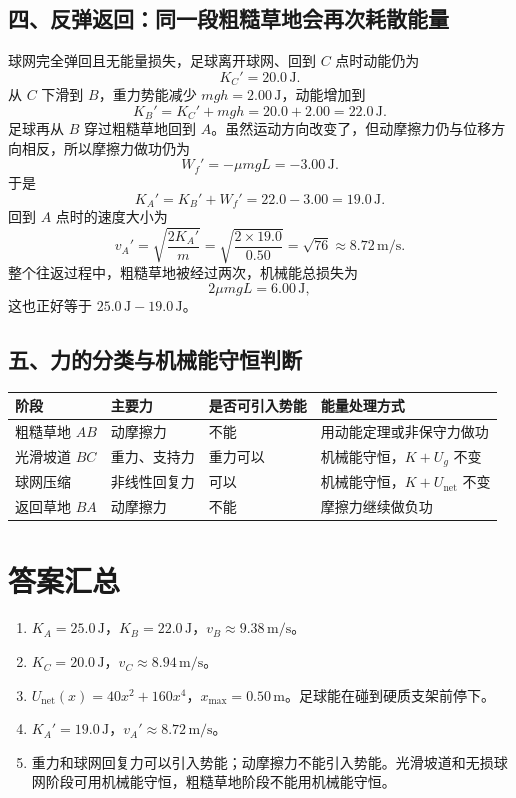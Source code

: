 \documentclass[11pt,a4paper,fontset=fandol]{ctexart}
\begin{document}
\subsection*{四、反弹返回：同一段粗糙草地会再次耗散能量}
球网完全弹回且无能量损失，足球离开球网、回到 $C$ 点时动能仍为
\[
 K_C'=20.0\,\mathrm{J}.
\]
从 $C$ 下滑到 $B$，重力势能减少 $mgh=2.00\,\mathrm{J}$，动能增加到
\[
 K_B'=K_C'+mgh=20.0+2.00=22.0\,\mathrm{J}.
\]
足球再从 $B$ 穿过粗糙草地回到 $A$。虽然运动方向改变了，但动摩擦力仍与位移方向相反，所以摩擦力做功仍为
\[
 W_f'=-\mu mgL=-3.00\,\mathrm{J}.
\]
于是
\[
 K_A'=K_B'+W_f'=22.0-3.00=19.0\,\mathrm{J}.
\]
回到 $A$ 点时的速度大小为
\[
 v_A'=\sqrt{\frac{2K_A'}{m}}=\sqrt{\frac{2\times 19.0}{0.50}}
=\sqrt{76}\approx 8.72\,\mathrm{m/s}.
\]
整个往返过程中，粗糙草地被经过两次，机械能总损失为
\[
 2\mu mgL=6.00\,\mathrm{J},
\]
这也正好等于 $25.0\,\mathrm{J}-19.0\,\mathrm{J}$。

\subsection*{五、力的分类与机械能守恒判断}
\begin{center}
\renewcommand{\arraystretch}{1.35}
\begin{tabular}{>{\centering\arraybackslash}p{2.7cm}>{\centering\arraybackslash}p{3.2cm}>{\centering\arraybackslash}p{3.2cm}>{\centering\arraybackslash}p{4.4cm}}
\toprule
阶段 & 主要力 & 是否可引入势能 & 能量处理方式 \\
\midrule
粗糙草地 $AB$ & 动摩擦力 & 不能 & 用动能定理或非保守力做功 \\
光滑坡道 $BC$ & 重力、支持力 & 重力可以 & 机械能守恒，$K+U_g$ 不变 \\
球网压缩 & 非线性回复力 & 可以 & 机械能守恒，$K+U_{\mathrm{net}}$ 不变 \\
返回草地 $BA$ & 动摩擦力 & 不能 & 摩擦力继续做负功 \\
\bottomrule
\end{tabular}
\end{center}

\section*{答案汇总}
\begin{ideaBox}
\begin{enumerate}
 \item $K_A=25.0\,\mathrm{J}$，$K_B=22.0\,\mathrm{J}$，$v_B\approx 9.38\,\mathrm{m/s}$。
 \item $K_C=20.0\,\mathrm{J}$，$v_C\approx 8.94\,\mathrm{m/s}$。
 \item $U_{\mathrm{net}}(x)=40x^2+160x^4$，$x_{\max}=0.50\,\mathrm{m}$。足球能在碰到硬质支架前停下。
 \item $K_A'=19.0\,\mathrm{J}$，$v_A'\approx 8.72\,\mathrm{m/s}$。
 \item 重力和球网回复力可以引入势能；动摩擦力不能引入势能。光滑坡道和无损球网阶段可用机械能守恒，粗糙草地阶段不能用机械能守恒。
\end{enumerate}
\end{ideaBox}
\end{document}
